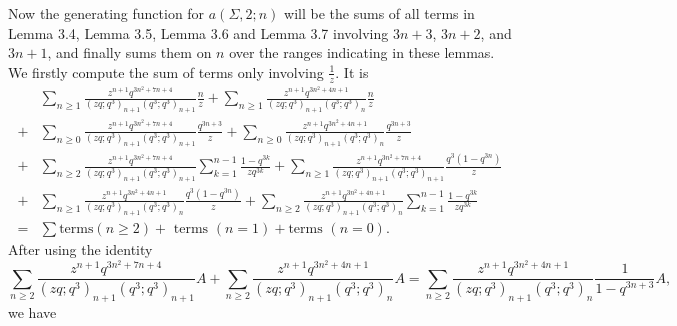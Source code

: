 \documentclass[draft]{amsart}
\numberwithin{equation}{section}
\theoremstyle{plain}
\theoremstyle{remark}
\begin{document}
Now the generating function for $a(\Sigma, 2;  n)$ will be the sums of all terms in Lemma 3.4, Lemma 3.5, Lemma 3.6 and Lemma 3.7 involving $3n+3$, $3n+2$, and $3n+1$,  and finally sums them on $n$ over the ranges indicating in these lemmas.
We firstly  compute the sum of terms only involving $\frac{1}{z}$. It is
\begin{align}\nonumber
&\sum_{n\geq 1}\frac{z^{n+1}q^{3n^{2}+7n+4}}{(zq;q^{3})_{n+1}(q^{3};q^{3})_{n+1}}\frac{n}{z}
+\sum_{n\geq 1}\frac{z^{n+1}q^{3n^{2}+4n+1}}{(zq;q^{3})_{n+1}(q^{3};q^{3})_{n}} \frac{n}{z} \\\nonumber
+&\sum_{n\geq 0}\frac{z^{n+1}q^{3n^{2}+7n+4}}{(zq;q^{3})_{n+1}(q^{3};q^{3})_{n+1}}\frac{q^{3n+3}}{z}
+\sum_{n\geq 0}\frac{z^{n+1}q^{3n^{2}+4n+1}}{(zq;q^{3})_{n+1}(q^{3};q^{3})_{n}}\frac{q^{3n+3}}{z}\\\nonumber
+&\sum_{n\geq 2}\frac{z^{n+1}q^{3n^{2}+7n+4}}{(zq;q^{3})_{n+1}(q^{3};q^{3})_{n+1}}\sum_{k=1} ^{n-1}\frac{1-q^{3k}}{zq^{3k}} 
+\sum_{n\geq 1} \frac{z^{n+1}q^{3n^{2}+7n+4}}{(zq;q^{3})_{n+1}(q^{3};q^{3})_{n+1}} \frac{q^{3}(1-q^{3n})}{z} \\\nonumber
+ &\sum_{n\geq 1}\frac{z^{n+1}q^{3n^{2}+4n+1}}{(zq;q^{3})_{n+1}(q^{3};q^{3})_{n}} \frac{q^{3}(1-q^{3n})}{z}
+\sum_{n\geq 2}\frac{z^{n+1}q^{3n^{2}+4n+1}}{(zq;q^{3})_{n+1}(q^{3};q^{3})_{n}}
\sum_{k=1} ^{n-1}\frac{1-q^{3k}}{zq^{3k}}\\\nonumber
=& \sum\mbox{terms}(n\geq 2) + \mbox{ terms }(n=1) + \mbox{terms }(n=0).   \nonumber
\end{align}
After using the identity
$$  
\sum_{n\geq 2}\frac{z^{n+1}q^{3n^{2}+7n+4}}{(zq;q^{3})_{n+1}(q^{3};q^{3})_{n+1}}A
+\sum_{n\geq 2}\frac{z^{n+1}q^{3n^{2}+4n+1}}{(zq;q^{3})_{n+1}(q^{3};q^{3})_{n}} A
=\sum_{n\geq 2}\frac{z^{n+1}q^{3n^{2}+4n+1}}{(zq;q^{3})_{n+1}(q^{3};q^{3})_{n}} \frac{1}{1-q^{3n+3}}A,
$$ we have
\end{document}
